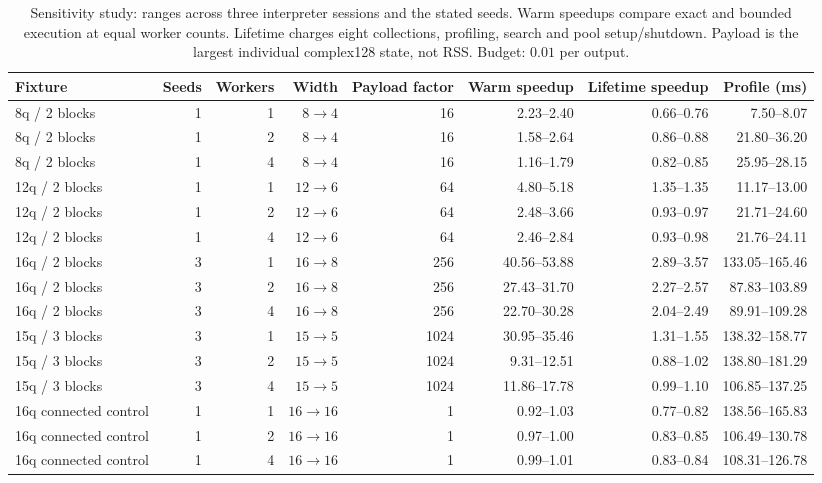 \begin{table}[t]
\centering
\caption{Sensitivity study: ranges across three interpreter sessions and the stated seeds. Warm speedups compare exact and bounded execution at equal worker counts. Lifetime charges eight collections, profiling, search and pool setup/shutdown. Payload is the largest individual complex128 state, not RSS. Budget: $0.01$ per output.}
\label{tab:sensitivity-results}
\footnotesize
\begin{tabular}{lrrrrrrr}
\toprule
Fixture & Seeds & Workers & Width & Payload factor & Warm speedup & Lifetime speedup & Profile (ms) \\
\midrule
8q / 2 blocks & 1 & 1 & $8\to 4$ & 16 & 2.23--2.40 & 0.66--0.76 & 7.50--8.07 \\
8q / 2 blocks & 1 & 2 & $8\to 4$ & 16 & 1.58--2.64 & 0.86--0.88 & 21.80--36.20 \\
8q / 2 blocks & 1 & 4 & $8\to 4$ & 16 & 1.16--1.79 & 0.82--0.85 & 25.95--28.15 \\
12q / 2 blocks & 1 & 1 & $12\to 6$ & 64 & 4.80--5.18 & 1.35--1.35 & 11.17--13.00 \\
12q / 2 blocks & 1 & 2 & $12\to 6$ & 64 & 2.48--3.66 & 0.93--0.97 & 21.71--24.60 \\
12q / 2 blocks & 1 & 4 & $12\to 6$ & 64 & 2.46--2.84 & 0.93--0.98 & 21.76--24.11 \\
16q / 2 blocks & 3 & 1 & $16\to 8$ & 256 & 40.56--53.88 & 2.89--3.57 & 133.05--165.46 \\
16q / 2 blocks & 3 & 2 & $16\to 8$ & 256 & 27.43--31.70 & 2.27--2.57 & 87.83--103.89 \\
16q / 2 blocks & 3 & 4 & $16\to 8$ & 256 & 22.70--30.28 & 2.04--2.49 & 89.91--109.28 \\
15q / 3 blocks & 3 & 1 & $15\to 5$ & 1024 & 30.95--35.46 & 1.31--1.55 & 138.32--158.77 \\
15q / 3 blocks & 3 & 2 & $15\to 5$ & 1024 & 9.31--12.51 & 0.88--1.02 & 138.80--181.29 \\
15q / 3 blocks & 3 & 4 & $15\to 5$ & 1024 & 11.86--17.78 & 0.99--1.10 & 106.85--137.25 \\
16q connected control & 1 & 1 & $16\to 16$ & 1 & 0.92--1.03 & 0.77--0.82 & 138.56--165.83 \\
16q connected control & 1 & 2 & $16\to 16$ & 1 & 0.97--1.00 & 0.83--0.85 & 106.49--130.78 \\
16q connected control & 1 & 4 & $16\to 16$ & 1 & 0.99--1.01 & 0.83--0.84 & 108.31--126.78 \\
\bottomrule
\end{tabular}
\end{table}
